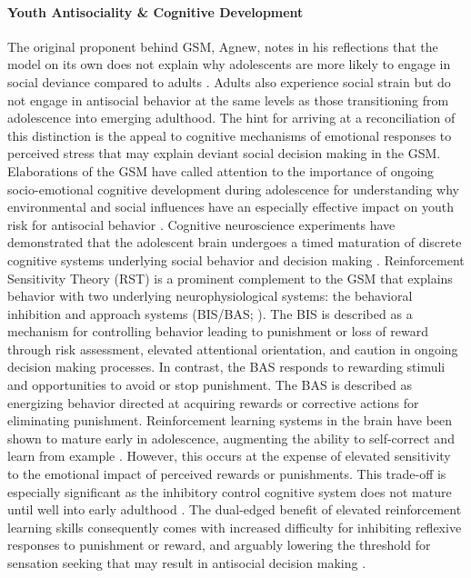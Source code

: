 \documentclass[utf8]{article}
\begin{document}
\paragraph{Youth Antisociality \& Cognitive Development} The original proponent behind GSM, Agnew, notes in his reflections that the model on its own does not explain why adolescents are more likely to engage in social deviance compared to adults \citep{froggio2007strain,agnew2012reflection}. Adults also experience social strain but do not engage in antisocial behavior at the same levels as those transitioning from adolescence into emerging adulthood. The hint for arriving at a reconciliation of this distinction is the appeal to cognitive mechanisms of emotional responses to perceived stress that may explain deviant social decision making in the GSM. Elaborations of the GSM have called attention to the importance of ongoing socio-emotional cognitive development during adolescence for understanding why environmental and social influences have an especially effective impact on youth risk for antisocial behavior \citep{hasking2007reinforcement}. Cognitive neuroscience experiments have demonstrated that the adolescent brain undergoes a timed maturation of discrete cognitive systems underlying social behavior and decision making \citep{CaseyEtAl2008}. Reinforcement Sensitivity Theory (RST) is a prominent complement to the GSM that explains behavior with two underlying neurophysiological systems: the behavioral inhibition and approach systems (BIS/BAS; \cite{carver1994behavioral,gray1970psychophysiological}). The BIS is described as a mechanism for controlling behavior leading to punishment or loss of reward through risk assessment, elevated attentional orientation, and caution in ongoing decision making processes. In contrast, the BAS responds to rewarding stimuli and opportunities to avoid or stop punishment. The BAS is described as energizing behavior directed at acquiring rewards or corrective actions for eliminating punishment. Reinforcement learning systems in the brain have been shown to mature early in adolescence, augmenting the ability to self-correct and learn from example \citep{somerville2010time}. However, this occurs at the expense of elevated sensitivity to the emotional impact of perceived rewards or punishments. This trade-off is especially significant as the inhibitory control cognitive system does not mature until well into early adulthood \citep{somerville2010developmental}. The dual-edged benefit of elevated reinforcement learning skills consequently comes with increased difficulty for inhibiting reflexive responses to punishment or reward, and arguably lowering the threshold for sensation seeking that may result in antisocial decision making \citep{LunaWright2016}. 
\end{document}
